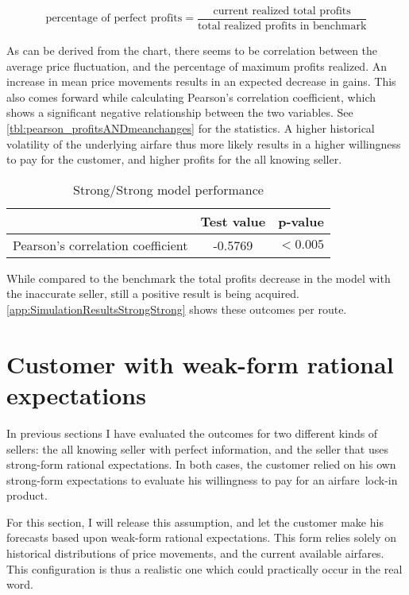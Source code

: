 $$ \mbox{percentage of perfect profits} = \frac{\mbox{current realized total profits}}{\mbox{total realized profits in benchmark}} $$

As can be derived from the chart, there seems to be correlation between the average price fluctuation, and the percentage of maximum profits realized. An increase in mean price movements results in an expected decrease in gains. This also comes forward while calculating Pearson's correlation coefficient, which shows a significant negative relationship between the two variables. See \autoref{tbl:pearson_profitsANDmeanchanges} for the statistics. A higher historical volatility of the underlying airfare thus more likely results in a higher willingness to pay for the customer, and higher profits for the all knowing seller.


\begin{table}
\centering
\begin{tabular}{l c c}
\toprule
~  &  Test value  &  p-value  \\
\midrule
Pearson's correlation coefficient   &  -0.5769  &  $< 0.005$ \\
\bottomrule
\end{tabular}
\caption{Strong/Strong model performance}
\label{tbl:pearson_profitsANDmeanchanges}
\end{table}


While compared to the benchmark the total profits decrease in the model with the inaccurate seller, still a positive result is being acquired. \autoref{app:SimulationResultsStrongStrong} shows these outcomes per route.





\section{Customer with weak-form rational expectations}
\label{sec:WeakCustomer}
In previous sections I have evaluated the outcomes for two different kinds of sellers: the all knowing seller with perfect information, and the seller that uses strong-form rational expectations. In both cases, the customer relied on his own strong-form expectations to evaluate his willingness to pay for an airfare~lock-in product.

For this section, I will release this assumption, and let the customer make his forecasts based upon weak-form rational expectations. This form relies solely on historical distributions of price movements, and the current available airfares. This configuration is thus a realistic one which could practically occur in the real word.

